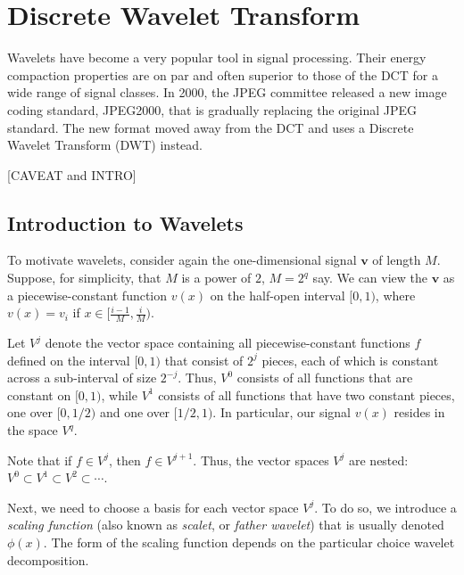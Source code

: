 \section{Discrete Wavelet Transform}
Wavelets have become a very popular tool in signal processing.
Their energy compaction properties are on par and often superior to those of the DCT for a wide range of signal classes.
In 2000, the JPEG committee released a new image coding standard, JPEG2000, that is gradually replacing the original JPEG standard.
The new format moved away from the DCT and uses a Discrete Wavelet Transform (DWT) instead.

[CAVEAT and INTRO]

\subsection{Introduction to Wavelets}
To motivate wavelets, consider again the one-dimensional signal $\bm v$ of length $M$.
Suppose, for simplicity, that $M$ is a power of $2$, $M = 2^q$ say.
We can view the $\bm v$ as a piecewise-constant function $v(x)$ on the half-open interval $[0,1)$, where $v(x) = v_i$ if $x \in [\frac{i-1}{M}, \frac{i}{M})$.

Let $V^j$ denote the vector space containing all piecewise-constant functions $f$ defined on the interval $[0,1)$ that consist of $2^j$ pieces, each of which is constant across a sub-interval of size $2^{-j}$.
Thus, $V^0$ consists of all functions that are constant on $[0,1)$, while $V^1$ consists of all functions that have two constant pieces, one over $[0,1/2)$ and one over $[1/2,1)$.
In particular, our signal $v(x)$ resides in the space $V^q$.

Note that if $f \in V^j$, then $f \in V^{j+1}$.
Thus, the vector spaces $V^j$ are nested: $V^0 \subset V^1 \subset V^2 \subset \cdots$.

Next, we need to choose a basis for each vector space $V^j$.
To do so, we introduce a \emph{scaling function} (also known as \emph{scalet}, or \emph{father wavelet}) that is usually denoted $\phi(x)$.
The form of the scaling function depends on the particular choice wavelet decomposition.

